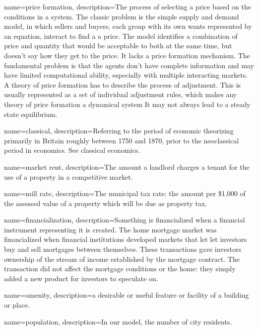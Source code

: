 {
name=price formation,
description={The process of selecting a price based on the conditions in a system. The classic problem is the simple supply and demand model, in which sellers and buyers, each group with its own wants represented by an equation, interact to find a a price. The model  identifies a combination of price and quantity that would be acceptable to both at the same time, but doesn't say how they get to the price. It lacks a price formation mechanism.  \newline The fundamental problem is that the agents don't have complete information and may have limited computational ability, especially with multiple interacting markets. A theory of price formation has to describe the process of adjustment. This is usually represented as a set of individual adjustment rules, which makes any theory of price formation a dynamical system It may not always lead to a steady state equilibrium.}
}

{
name=classical,
description={Referring to the period of economic theorizing primarily in Britain roughly between 1750 and 1870, prior to the neoclassical period in economics. See \gls{classical economics}.   }
}

{
name=market rent,
description={The amount a landlord charges a tenant for the use of a property in a competitive market. }
}

{
name=mill rate,
description={The municipal tax rate: the amount per \$1,000 of the assessed value of a property which will be due as property tax.}
}

{
name=financialization,
description={Something is financialized when a financial instrument representing it is created. The  home mortgage market was financialized when financial institutions developed markets that let let investors buy and sell mortgages between themselves. These transactions gave investors ownership of the stream of income established by the mortgage contract. The transaction did not affect the mortgage conditions or the home: they simply added a new product for investors to speculate on. }
}

{
name=amenity,
description={a desirable or useful feature or facility of a building or place.}
}

{
name=population,
description={In our model, the number of city residents. }
}

